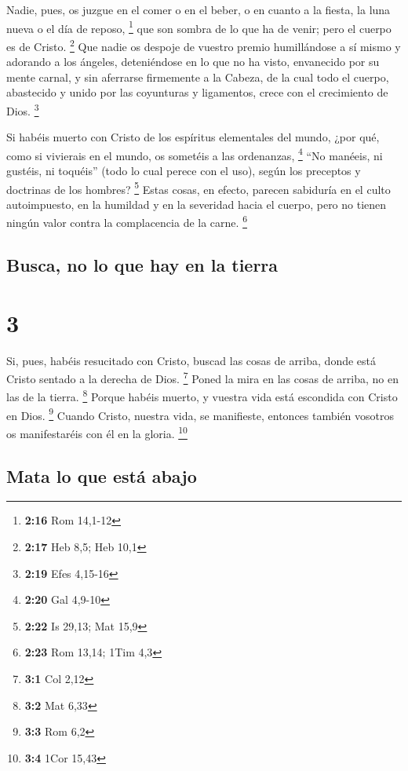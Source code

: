  Nadie, pues, os juzgue en el comer o en el beber, o en
cuanto a la fiesta, la luna nueva o el día de reposo, \footnote{\textbf{2:16}
  Rom 14,1-12}  que son sombra de lo que ha de venir;
pero el cuerpo es de Cristo. \footnote{\textbf{2:17} Heb 8,5; Heb 10,1}
 Que nadie os despoje de vuestro premio humillándose a sí
mismo y adorando a los ángeles, deteniéndose en lo que no ha visto,
envanecido por su mente carnal,  y sin aferrarse
firmemente a la Cabeza, de la cual todo el cuerpo, abastecido y unido
por las coyunturas y ligamentos, crece con el crecimiento de Dios.
\footnote{\textbf{2:19} Efes 4,15-16}

 Si habéis muerto con Cristo de los espíritus elementales
del mundo, ¿por qué, como si vivierais en el mundo, os sometéis a las
ordenanzas, \footnote{\textbf{2:20} Gal 4,9-10}  ``No
manéeis, ni gustéis, ni toquéis''  (todo lo cual perece
con el uso), según los preceptos y doctrinas de los hombres? \footnote{\textbf{2:22}
  Is 29,13; Mat 15,9}  Estas cosas, en efecto, parecen
sabiduría en el culto autoimpuesto, en la humildad y en la severidad
hacia el cuerpo, pero no tienen ningún valor contra la complacencia de
la carne. \footnote{\textbf{2:23} Rom 13,14; 1Tim 4,3}

\hypertarget{busca-no-lo-que-hay-en-la-tierra}{%
\subsection{Busca, no lo que hay en la
tierra}\label{busca-no-lo-que-hay-en-la-tierra}}

\hypertarget{section-2}{%
\section{3}\label{section-2}}

 Si, pues, habéis resucitado con Cristo, buscad las cosas
de arriba, donde está Cristo sentado a la derecha de Dios. \footnote{\textbf{3:1}
  Col 2,12}  Poned la mira en las cosas de arriba, no en
las de la tierra. \footnote{\textbf{3:2} Mat 6,33}  Porque
habéis muerto, y vuestra vida está escondida con Cristo en Dios.
\footnote{\textbf{3:3} Rom 6,2}  Cuando Cristo, nuestra
vida, se manifieste, entonces también vosotros os manifestaréis con él
en la gloria. \footnote{\textbf{3:4} 1Cor 15,43}

\hypertarget{mata-lo-que-estuxe1-abajo}{%
\subsection{Mata lo que está abajo}\label{mata-lo-que-estuxe1-abajo}}

